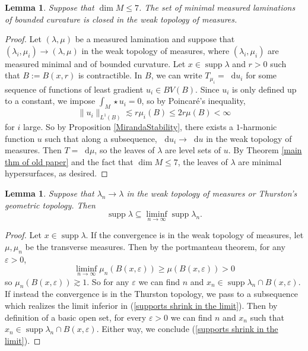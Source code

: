\documentclass[reqno,11pt]{amsart}
\newcommand*\dif{\mathop{}\!\mathrm{d}}
\DeclareMathOperator{\supp}{supp}
\newtheorem{lemma}[theorem]{Lemma}
\theoremstyle{definition}
\numberwithin{equation}{section}
\begin{document}
\begin{lemma}\label{limits of measured geodesic lams are geodesic}
Suppose that $\dim M \leq 7$. The set of minimal measured laminations of bounded curvature is closed in the weak topology of measures.
\end{lemma}
\begin{proof}
Let $(\lambda, \mu)$ be a measured lamination and suppose that $(\lambda_i, \mu_i) \to (\lambda, \mu)$ in the weak topology of measures, where $(\lambda_i, \mu_i)$ are measured minimal and of bounded curvature.
Let $x \in \supp \lambda$ and $r > 0$ such that $B := B(x, r)$ is contractible.
In $B$, we can write $T_{\mu_i} = \dif u_i$ for some sequence of functions of least gradient $u_i \in BV(B)$.
Since $u_i$ is only defined up to a constant, we impose $\int_M \star u_i = 0$, so by Poincar\'e's inequality,
$$\|u_i\|_{L^1(B)} \lesssim r\mu_i(B) \leq 2r \mu(B) < \infty$$
for $i$ large.
So by Proposition \ref{MirandaStability}, there exists a $1$-harmonic function $u$ such that along a subsequence, $\dif u_i \to \dif u$ in the weak topology of measures.
Then $T = \dif \mu$, so the leaves of $\lambda$ are level sets of $u$.
By Theorem \ref{main thm of old paper} and the fact that $\dim M \leq 7$, the leaves of $\lambda$ are minimal hypersurfaces, as desired.
\end{proof}

\begin{lemma}
Suppose that $\lambda_n \to \lambda$ in the weak topology of measures or Thurston's geometric topology.
Then 
\begin{equation}\label{supports shrink in the limit}
\supp \lambda \subseteq \liminf_{n \to \infty} \supp \lambda_n.
\end{equation}
\end{lemma}
\begin{proof}
Let $x \in \supp \lambda$.
If the convergence is in the weak topology of measures, let $\mu, \mu_n$ be the transverse measures.
Then by the portmanteau theorem, for any $\varepsilon > 0$,
$$\liminf_{n \to \infty} \mu_n(B(x, \varepsilon)) \geq \mu(B(x, \varepsilon)) > 0$$
so $\mu_n(B(x, \varepsilon)) \gtrsim 1$.
So for any $\varepsilon$ we can find $n$ and $x_n \in \supp \lambda_n \cap B(x, \varepsilon)$.
If instead the convergence is in the Thurston topology, we pass to a subsequence which realizes the limit inferior in (\ref{supports shrink in the limit}).
Then by definition of a basic open set, for every $\varepsilon > 0$ we can find $n$ and $x_n$ such that $x_n \in \supp \lambda_n \cap B(x, \varepsilon)$.
Either way, we conclude (\ref{supports shrink in the limit}).
\end{proof}
\end{document}
